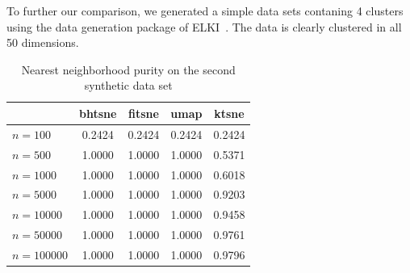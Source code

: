 To further our comparison, we generated a simple data sets contaning 4 clusters using the data
generation package of ELKI~\cite{elki}. The data is clearly clustered in all 50 dimensions.

\begin{table}
  \centering
  \begin{tabular}{lcccc}
    \toprule
      & bhtsne & fitsne & umap & ktsne\\ \midrule
      $n = 100$ & \num{0.2424} & \num{0.2424} & \num{0.2424} & \num{0.2424}\\
      $n = 500$ & \num{1.0000} & \num{1.0000} & \num{1.0000} & \num{0.5371}\\
      $n = 1000$ & \num{1.0000} & \num{1.0000} & \num{1.0000} & \num{0.6018}\\
      $n = 5000$ & \num{1.0000} & \num{1.0000} & \num{1.0000} & \num{0.9203}\\
      $n = 10000$ & \num{1.0000} & \num{1.0000} & \num{1.0000} & \num{0.9458}\\
      $n = 50000$ & \num{1.0000} & \num{1.0000} & \num{1.0000} & \num{0.9761}\\
      $n = 100000$ & \num{1.0000} & \num{1.0000} & \num{1.0000} & \num{0.9796}\\
    \bottomrule
  \end{tabular}
  \caption{Nearest neighborhood purity on the second synthetic data set}
  \label{tab:results-syn2}
\end{table}

